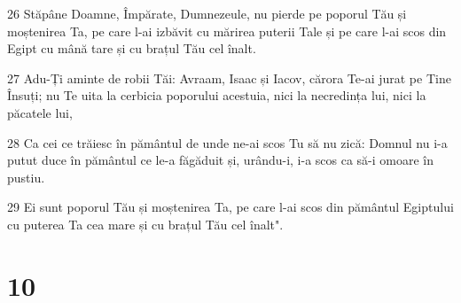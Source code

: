 \par 26 Stăpâne Doamne, Împărate, Dumnezeule, nu pierde pe poporul Tău și moștenirea Ta, pe care l-ai izbăvit cu mărirea puterii Tale și pe care l-ai scos din Egipt cu mână tare și cu brațul Tău cel înalt.
\par 27 Adu-Ți aminte de robii Tăi: Avraam, Isaac și Iacov, cărora Te-ai jurat pe Tine Însuți; nu Te uita la cerbicia poporului acestuia, nici la necredința lui, nici la păcatele lui,
\par 28 Ca cei ce trăiesc în pământul de unde ne-ai scos Tu să nu zică: Domnul nu i-a putut duce în pământul ce le-a făgăduit și, urându-i, i-a scos ca să-i omoare în pustiu.
\par 29 Ei sunt poporul Tău și moștenirea Ta, pe care l-ai scos din pământul Egiptului cu puterea Ta cea mare și cu brațul Tău cel înalt".

\chapter{10}

